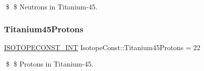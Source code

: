 \$ \$ Neutrons in Titanium-\/45. \mbox{\label{group___isotope_const-_titanium-_ti45_ga3e8bd2ff549eaf3e3949e6a307cdd9ef}} 
\subsubsection{\texorpdfstring{Titanium45\+Protons}{Titanium45Protons}}
{\footnotesize\ttfamily \mbox{\hyperlink{group___isotope_const-_macros_ga5f18360b3e99483a35c32d789e62621c}{I\+S\+O\+T\+O\+P\+E\+C\+O\+N\+S\+T\+\_\+\+I\+NT}} Isotope\+Const\+::\+Titanium45\+Protons = 22}

\$ \$ Protons in Titanium-\/45. 